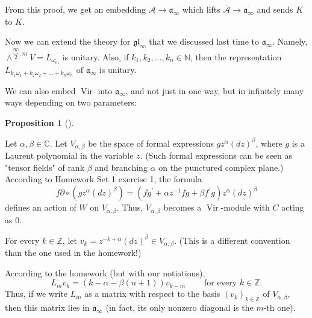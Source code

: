 \documentclass
[numbers=enddot,12pt,final,onecolumn,german,notitlepage]{scrartcl}%
\theoremstyle{definition}
\newtheorem{prop}[theo]{Proposition}
\newenvironment{proposition}[1][]
{\begin{prop}[#1]\begin{leftbar}}
{\end{leftbar}\end{prop}}
\begin{document}
From this proof, we get an embedding $\mathcal{A}\rightarrow\mathfrak{a}%
_{\infty}$ which lifts $\overline{\mathcal{A}}\rightarrow\overline
{\mathfrak{a}_{\infty}}$ and sends $K$ to $K$.

Now we can extend the theory for $\mathfrak{gl}_{\infty}$ that we discussed
last time to $\mathfrak{a}_{\infty}$. Namely, $\wedge^{\dfrac{\infty}{2}%
,m}V=L_{\omega_{m}}$ is unitary. Also, if $k_{1},k_{2},...,k_{n}\in\mathbb{N}%
$, then the representation $L_{k_{1}\omega_{1}+k_{2}\omega_{2}+...+k_{n}%
\omega_{n}}$ of $\mathfrak{a}_{\infty}$ is unitary.

We can also embed $\operatorname*{Vir}$ into $\mathfrak{a}_{\infty}$, and not
just in one way, but in infinitely many ways depending on two parameters:

\begin{proposition}
Let $\alpha,\beta\in\mathbb{C}$. Let $V_{\alpha,\beta}$ be the space of formal
expressions $gz^{\alpha}\left(  dz\right)  ^{\beta}$, where $g$ is a Laurent
polynomial in the variable $z$. (Such formal expressions can be seen as
"tensor fields" of rank $\beta$ and branching $\alpha$ on the punctured
complex plane.) According to Homework Set 1 exercise 1, the formula
\begin{equation}
f\partial\circ\left(  gz^{\alpha}\left(  dz\right)  ^{\beta}\right)  =\left(
fg^{\prime}+\alpha z^{-1}fg+\beta f^{\prime}g\right)  z^{\alpha}\left(
dz\right)  ^{\beta} \label{ex1.1.1}%
\end{equation}
defines an action of $W$ on $V_{\alpha,\beta}$. Thus, $V_{\alpha,\beta}$
becomes a $\operatorname*{Vir}$-module with $C$ acting as $0$.

For every $k\in\mathbb{Z}$, let $v_{k}=z^{-k+\alpha}\left(  dz\right)
^{\beta}\in V_{\alpha,\beta}$. (This is a different convention than the one
used in the homework!)

According to the homework (but with our notiations),%
\[
L_{m}v_{k}=\left(  k-\alpha-\beta\left(  n+1\right)  \right)  v_{k-m}%
\ \ \ \ \ \ \ \ \ \ \text{for every }k\in\mathbb{Z}.
\]
Thus, if we write $L_{m}$ as a matrix with respect to the basis $\left(
v_{k}\right)  _{k\in\mathbb{Z}}$ of $V_{\alpha,\beta}$, then this matrix lies
in $\overline{\mathfrak{a}_{\infty}}$ (in fact, its only nonzero diagonal is
the $m$-th one).


\end{proposition}
\end{document}
